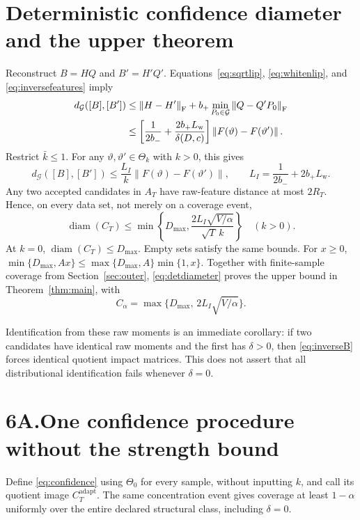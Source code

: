 \documentclass[11pt,a4paper]{article}
\numberwithin{equation}{section}
\newcommand{\cG}{\mathcal G}
\newcommand{\F}{\mathrm F}
\newcommand{\norm}[1]{\left\lVert #1\right\rVert}
\DeclareMathOperator{\diam}{diam}
\begin{document}
\section{Deterministic confidence diameter and the upper theorem}\label{sec:upper}
Reconstruct \(B=HQ\) and \(B'=H'Q'\).
Equations~\eqref{eq:sqrtlip}, \eqref{eq:whitenlip}, and
\eqref{eq:inversefeatures} imply
\begin{align}
 d_{\cG}([B],[B'])
 &\le\norm{H-H'}_{\F}
       +b_+\min_{P_0\in\cG}\norm{Q-Q'P_0}_{\F}\notag\\
 &\le\left[\frac1{2b_-}+\frac{2b_+L_{\mathrm w}}{\delta(D,c)}\right]
             \norm{F(\vartheta)-F(\vartheta')}.\label{eq:inverseB}
\end{align}
Restrict \(\bar k\le1\). For any \(\vartheta,\vartheta'\in\Theta_k\)
with \(k>0\), this gives
\begin{equation}\label{eq:inversek}
 d_{\cG}([B],[B'])
 \le\frac{L_I}{k}\norm{F(\vartheta)-F(\vartheta')},\qquad
 L_I=\frac1{2b_-}+2b_+L_{\mathrm w}.
\end{equation}
Any two accepted candidates in \(A_T\) have raw-feature distance at most
\(2R_T\). Hence, on every data set, not merely on a coverage event,
\begin{equation}\label{eq:detdiameter}
 \diam(C_T)
 \le\min\left\{D_{\max},
       \frac{2L_I\sqrt{V/\alpha}}{\sqrt T\,k}\right\}
 \quad(k>0).
\end{equation}
At \(k=0\), \(\diam(C_T)\le D_{\max}\).
Empty sets satisfy the same bounds.
For \(x\ge0\),
\(\min\{D_{\max},Ax\}\le\max\{D_{\max},A\}\min\{1,x\}\).
Together with finite-sample coverage from Section~\ref{sec:outer},
\eqref{eq:detdiameter} proves the upper bound in
Theorem~\ref{thm:main}, with
\[
 C_\alpha=\max\{D_{\max},\,2L_I\sqrt{V/\alpha}\}.
\]

Identification from these raw moments is an immediate corollary:
if two candidates have identical raw moments and the first has
\(\delta>0\), then \eqref{eq:inverseB} forces identical quotient impact
matrices. This does not assert that all distributional identification
fails whenever \(\delta=0\).

\section*{6A.\quad One confidence procedure without the strength bound}
Define \eqref{eq:confidence} using \(\Theta_0\) for every sample, without
inputting \(k\), and call its quotient image \(C_T^{\mathrm{adapt}}\).
The same concentration event gives coverage at least \(1-\alpha\)
uniformly over the entire declared structural class, including
\(\delta=0\).
\end{document}
